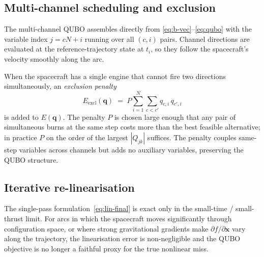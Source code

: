 \documentclass[11pt,a4paper]{article}
\theoremstyle{plain}
\newcommand{\bvec}[1]{\bm{#1}}
\newcommand{\xvec}{\bvec{x}}
\newcommand{\qvec}{\bvec{q}}
\begin{document}
\subsection{Multi-channel scheduling and exclusion}\label{sec:method-multi}

The multi-channel QUBO assembles directly from
\eqref{eq:b-vec}--\eqref{eq:qubo} with the variable index
$j = cN+i$ running over all $(c, i)$ pairs. Channel directions
are evaluated at the reference-trajectory state at $t_i$, so they
follow the spacecraft's velocity smoothly along the arc.

When the spacecraft has a single engine that cannot fire two
directions simultaneously, an \emph{exclusion penalty}
\begin{equation}\label{eq:exclusion}
  E_\mathrm{excl}(\qvec)
  \;=\; P \sum_{i=1}^{N} \sum_{c < c'} q_{c,i}\, q_{c',i}
\end{equation}
is added to $E(\qvec)$. The penalty $P$ is chosen large enough
that any pair of simultaneous burns at the same step costs more
than the best feasible alternative; in practice $P$ on the order
of the largest $|Q_{jk}|$ suffices. The penalty couples
same-step variables across channels but adds no auxiliary
variables, preserving the QUBO structure.

\subsection{Iterative re-linearisation}\label{sec:method-iterative}

The single-pass formulation~\eqref{eq:lin-final} is exact only in
the small-time / small-thrust limit. For arcs in which the
spacecraft moves significantly through configuration space, or
where strong gravitational gradients make
$\partial f/\partial \xvec$ vary along the trajectory, the
linearisation error is non-negligible and the QUBO objective is
no longer a faithful proxy for the true nonlinear miss.
\end{document}
